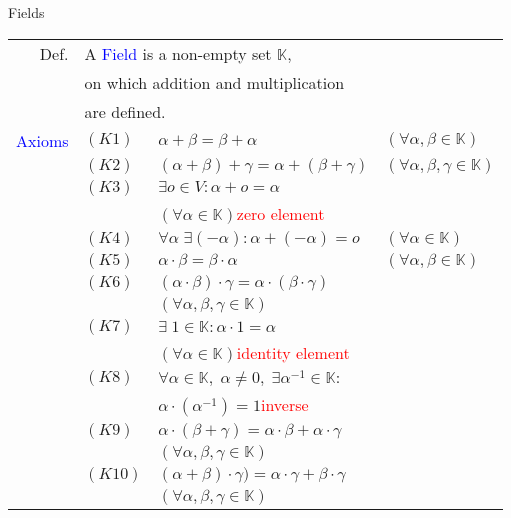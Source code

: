 \begin{mainbox}{Fields}
\setlength{\tabcolsep}{2pt}
\begin{tabular}{rlll}
	Def. & \multicolumn{3}{l}{A \textcolor{blue}{Field} is a non-empty set $\mathbb{K}$,}\\
	& \multicolumn{3}{l}{on which addition and multiplication}\\
	& \multicolumn{3}{l}{are defined.}\\
	\rule{0pt}{3ex} 
	\textcolor{blue}{Axioms} & $(K1)$ & $\alpha +\beta =\beta +\alpha$ & $(\forall \alpha, \beta \in \mathbb{K})$\\
	& $(K2)$ & $(\alpha +\beta )+\gamma =\alpha +(\beta +\gamma )$ & $(\forall \alpha,\beta,\gamma \in \mathbb{K})$\\
	& $(K3)$ & \multicolumn{2}{l}{$\exists o\in V: \alpha + o = \alpha$}\\
	& & \multicolumn{2}{l}{$(\forall \alpha \in \mathbb{K})$\quad\textcolor{red}{zero element}}\\
	& $(K4)$ & $\forall \alpha\;\exists (-\alpha): \alpha+(-\alpha) = o$ & $(\forall \alpha \in \mathbb{K})$\\
	& $(K5)$ & $\alpha\cdot\beta=\beta\cdot\alpha$ & $(\forall \alpha, \beta \in \mathbb{K})$\\
	& $(K6)$ & \multicolumn{2}{l}{$(\alpha\cdot\beta)\cdot\gamma = \alpha\cdot(\beta\cdot\gamma)$}\\
	& & \multicolumn{2}{l}{$(\forall \alpha, \beta, \gamma \in \mathbb{K})$}\\
	& $(K7)$ & \multicolumn{2}{l}{$\exists\;1 \in \mathbb{K}: \alpha \cdot 1 = \alpha$}\\
	& & \multicolumn{2}{l}{$(\forall \alpha \in \mathbb{K})$\quad\textcolor{red}{identity element}}\\
	& $(K8)$ & \multicolumn{2}{l}{$\forall \alpha \in \mathbb{K},\;\alpha \neq 0,\;\exists \alpha^{-1} \in \mathbb{K}:$}\\
	& & \multicolumn{2}{l}{$\alpha \cdot (\alpha^{-1}) = 1$\quad\textcolor{red}{inverse}}\\
	& $(K9)$ & \multicolumn{2}{l}{$\alpha\cdot(\beta + \gamma) = \alpha\cdot\beta + \alpha\cdot\gamma$}\\
	& & \multicolumn{2}{l}{$(\forall \alpha, \beta, \gamma \in \mathbb{K})$}\\
	& $(K10)$ & \multicolumn{2}{l}{$(\alpha + \beta)\cdot\gamma) = \alpha\cdot\gamma + \beta\cdot\gamma$}\\
	& & \multicolumn{2}{l}{$(\forall \alpha, \beta, \gamma \in \mathbb{K})$}\\
\end{tabular}
\end{mainbox}

